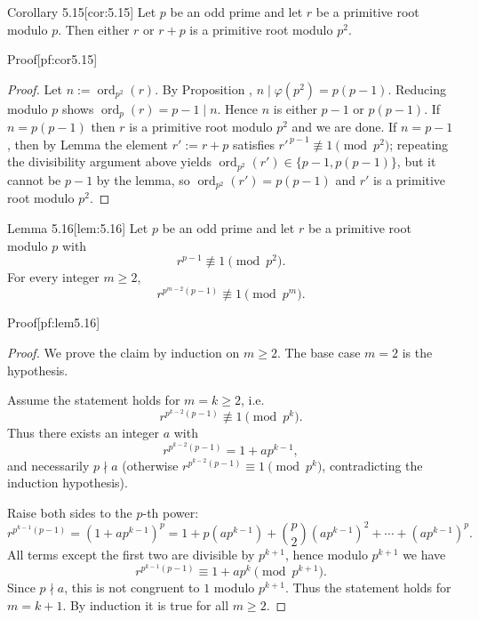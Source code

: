 \documentclass[10pt]{article}
\theoremstyle{definition}
\theoremstyle{plain}
\numberwithin{equation}{section}
\begin{document}
\begin{define}{Corollary 5.15}[cor:5.15]
Let $p$ be an odd prime and let $r$ be a primitive root modulo $p$. Then either $r$ or $r+p$ is a primitive root modulo $p^2$.
\end{define}

\begin{define}{Proof}[pf:cor5.15]
\begin{proof}
Let $n:=\operatorname{ord}_{p^2}(r)$. By Proposition , $n\mid\varphi(p^2)=p(p-1)$. Reducing modulo $p$ shows $\operatorname{ord}_p(r)=p-1\mid n$. Hence $n$ is either $p-1$ or $p(p-1)$. If $n=p(p-1)$ then $r$ is a primitive root modulo $p^2$ and we are done. If $n=p-1$, then by Lemma  the element $r':=r+p$ satisfies $r'^{\,p-1}\not\equiv1\pmod{p^2}$; repeating the divisibility argument above yields $\operatorname{ord}_{p^2}(r')\in\{p-1,p(p-1)\}$, but it cannot be $p-1$ by the lemma, so $\operatorname{ord}_{p^2}(r')=p(p-1)$ and $r'$ is a primitive root modulo $p^2$.
\end{proof}
\end{define}

\begin{define}{Lemma 5.16}[lem:5.16]
Let $p$ be an odd prime and let $r$ be a primitive root modulo $p$ with
\[
r^{p-1}\not\equiv 1\pmod{p^2}.
\]
For every integer $m\ge2$,
\[
r^{p^{m-2}(p-1)}\not\equiv 1\pmod{p^m}.
\]
\end{define}

\begin{define}{Proof}[pf:lem5.16]
\begin{proof}
We prove the claim by induction on $m\ge2$. The base case $m=2$ is the hypothesis.

Assume the statement holds for $m=k\ge2$, i.e.
\[
r^{p^{k-2}(p-1)}\not\equiv 1\pmod{p^k}.
\]
Thus there exists an integer $a$ with
\[
r^{p^{k-2}(p-1)}=1+a p^{k-1},
\]
and necessarily $p\nmid a$ (otherwise $r^{p^{k-2}(p-1)}\equiv1\pmod{p^k}$, contradicting the induction hypothesis).

Raise both sides to the $p$-th power:
\[
r^{p^{k-1}(p-1)}=(1+a p^{k-1})^p
=1+p(a p^{k-1})+\binom{p}{2}(a p^{k-1})^2+\cdots+(a p^{k-1})^p.
\]
All terms except the first two are divisible by $p^{k+1}$, hence modulo $p^{k+1}$ we have
\[
r^{p^{k-1}(p-1)}\equiv 1 + a p^k \pmod{p^{k+1}}.
\]
Since $p\nmid a$, this is not congruent to $1$ modulo $p^{k+1}$. Thus the statement holds for $m=k+1$. By induction it is true for all $m\ge2$.
\end{proof}
\end{define}
\end{document}
